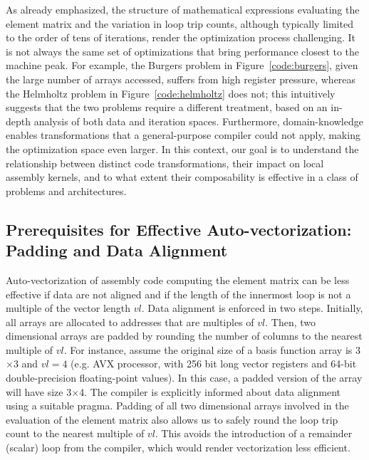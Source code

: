 \documentclass[conference]{IEEEtran}
\begin{document}
As already emphasized, the structure of mathematical expressions evaluating the element matrix and the variation in loop trip counts, although typically limited to the order of tens of iterations, render the optimization process challenging. It is not always the same set of optimizations that bring performance closest to the machine peak. For example, the Burgers problem in Figure~\ref{code:burgers}, given the large number of arrays accessed, suffers from high register pressure, whereas the Helmholtz problem in Figure~\ref{code:helmholtz} does not; this intuitively suggests that the two problems require a different treatment, based on an in-depth analysis of both data and iteration spaces. Furthermore, domain-knowledge enables transformations that a general-purpose compiler could not apply, making the optimization space even larger. In this context, our goal is to understand the relationship between distinct code transformations, their impact on local assembly kernels, and to what extent their composability is effective in a class of problems and architectures.


\subsection{Prerequisites for Effective Auto-vectorization: Padding and Data Alignment}
Auto-vectorization of assembly code computing the element matrix can be less effective if data are not aligned and if the length of the innermost loop is not a multiple of the vector length $vl$. Data alignment is enforced in two steps. Initially, all arrays are allocated to addresses that are multiples of $vl$. Then, two dimensional arrays are padded by rounding the number of columns to the nearest multiple of $vl$. For instance, assume the original size of a basis function array is 3$\times$3 and $vl=4$ (e.g. AVX processor, with 256 bit long vector registers and 64-bit double-precision floating-point values). In this case, a padded version of the array will have size 3$\times$4. The compiler is explicitly informed about data alignment using a suitable pragma. Padding of all two dimensional arrays involved in the evaluation of the element matrix also allows us to safely round the loop trip count to the nearest multiple of $vl$. This avoids the introduction of a remainder (scalar) loop from the compiler, which would render vectorization less efficient.
\end{document}
